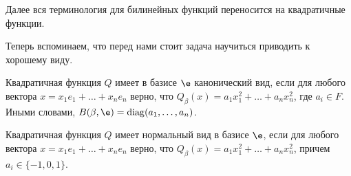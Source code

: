 Далее вся терминология для билинейных функций переносится на квадратичные функции.

Теперь вспоминаем, что перед нами стоит задача научиться приводить к хорошему виду.

\begin{Def}
Квадратичная функция $Q$ имеет в базисе $\e$ канонический вид, если для любого вектора $x = x_1e_1 + \ldots + x_ne_n$ верно, что $Q_\beta(x) = a_1x_1^2 +\ldots + a_nx_n^2$, где $a_i \in F$. Иными словами, $B(\beta, \e) = \diag(a_1, \ldots, a_n)$.
\end{Def}

\begin{Def}
Квадратичная функция $Q$ имеет нормальный вид в базисе $\e$, если для любого вектора $x = x_1e_1 + \ldots + x_ne_n$ верно, что $Q_\beta(x) = a_1x_1^2 +\ldots + a_nx_n^2$, причем $a_i \in \{-1, 0, 1\}$.  
\end{Def}

